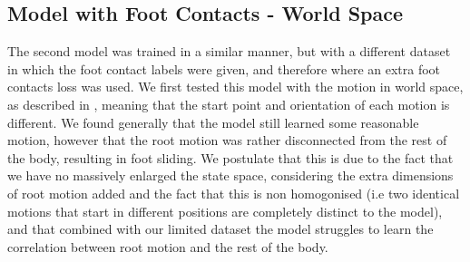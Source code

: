 \subsection{Model with Foot Contacts - World Space}
\label{sec:diffusion_contacts_world_space}

The second model was trained in a similar manner, but with a different dataset in which the foot contact labels were given, and therefore where an extra foot contacts loss was used. We first tested this model with the motion in world space, as described in , meaning that the start point and orientation of each motion is different. We found generally that the model still learned some reasonable motion, however that the root motion was rather disconnected from the rest of the body, resulting in foot sliding. We postulate that this is due to the fact that we have no massively enlarged the state space, considering the extra dimensions of root motion added and the fact that this is non homogonised (i.e two identical motions that start in different positions are completely distinct to the model), and that combined with our limited dataset the model struggles to learn the correlation between root motion and the rest of the body.


